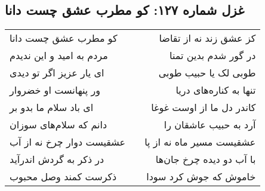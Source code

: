 \begin{center}
\section*{غزل شماره ۱۲۷: کو مطرب عشق چست دانا}
\label{sec:0127}
\begin{longtable}{l p{0.5cm} r}
کو مطرب عشق چست دانا
&&
کز عشق زند نه از تقاضا
\\
مردم به امید و این ندیدم
&&
در گور شدم بدین تمنا
\\
ای یار عزیز اگر تو دیدی
&&
طوبی لک یا حبیب طوبی
\\
ور پنهانست او خضروار
&&
تنها به کناره‌های دریا
\\
ای باد سلام ما بدو بر
&&
کاندر دل ما از اوست غوغا
\\
دانم که سلام‌های سوزان
&&
آرد به حبیب عاشقان را
\\
عشقیست دوار چرخ نه از آب
&&
عشقیست مسیر ماه نه از پا
\\
در ذکر به گردش اندرآید
&&
با آب دو دیده چرخ جان‌ها
\\
ذکرست کمند وصل محبوب
&&
خاموش که جوش کرد سودا
\\
\end{longtable}
\end{center}
